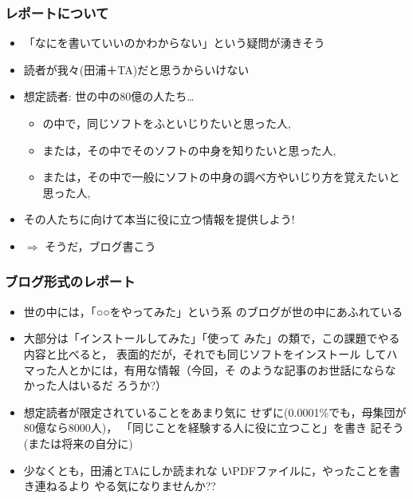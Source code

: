 \documentclass[12pt,dvipdfmx]{beamer}
\newcommand{\aka}[1]{{\color{red}#1}}
\begin{document}
\begin{frame}
\frametitle{レポートについて}
\begin{itemize}
\item<1-> 「なにを書いていいのかわからない」という疑問が湧きそう
\item<2-> 読者が我々(田浦＋TA)だと思うからいけない
\item<3-> 想定読者: 世の中の80億の人たち\ldots 
  \begin{itemize}
  \item の中で，同じソフトをふといじりたいと思った人, 
  \item または，その中でそのソフトの中身を知りたいと思った人, 
  \item または，その中で一般にソフトの中身の調べ方やいじり方を覚えたいと思った人, 
  \end{itemize}
\item<4-> その人たちに向けて本当に役に立つ情報を提供しよう!
\item<5-> $\Rightarrow$ そうだ，\aka{ブログ書こう}
\end{itemize}
\end{frame}

\begin{frame}
\frametitle{ブログ形式のレポート}
\begin{itemize}

\item<1-> 世の中には，「○○をやってみた」という系
  のブログが世の中にあふれている

\item<2-> 大部分は「インストールしてみた」「使って
  みた」の類で，この課題でやる内容と比べると，
  表面的だが，それでも同じソフトをインストール
  してハマった人とかには，有用な情報（今回，そ
  のような記事のお世話にならなかった人はいるだ
  ろうか?）

\item<3-> 想定読者が限定されていることをあまり気に
  せずに(0.0001\%でも，母集団が80億なら8000人)，
  「同じことを経験する人に役に立つこと」を書き
  記そう(または将来の自分に)

\item<4-> 少なくとも，田浦とTAにしか読まれな
  いPDFファイルに，やったことを書き連ねるより
  やる気になりませんか??
\end{itemize}
\end{frame}
\end{document}
